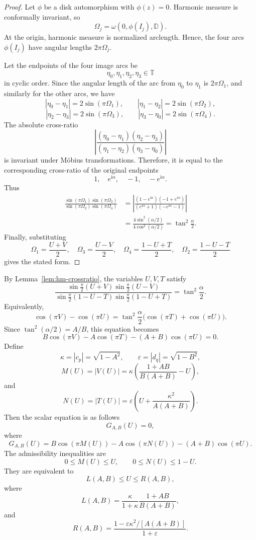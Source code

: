 \documentclass[11pt]{amsart}
\theoremstyle{remark}
\newcommand{\ii}{\mathrm i}
\newcommand{\eps}{\varepsilon}
\numberwithin{equation}{section}
\begin{document}
\begin{proof}
Let \(\phi\) be a disk automorphism with \(\phi(z)=0\).  Harmonic measure is
conformally invariant, so
\[
        \Omega_j=\omega(0,\phi(I_j),\mathbb D).
\]
At the origin, harmonic measure is normalized arclength.  Hence, the four arcs
\(\phi(I_j)\) have angular lengths \(2\pi\Omega_j\).

Let the endpoints of the four image arcs be
\[
        \eta_0,\eta_1,\eta_2,\eta_3\in\mathbb T
\]
in cyclic order.  Since the angular length of the arc from \(\eta_0\) to
\(\eta_1\) is \(2\pi\Omega_1\), and similarly for the other arcs, we have
\[
        |\eta_0-\eta_1|=2\sin(\pi\Omega_1),\qquad
        |\eta_1-\eta_2|=2\sin(\pi\Omega_2),
\]
\[
        |\eta_2-\eta_3|=2\sin(\pi\Omega_3),\qquad
        |\eta_3-\eta_0|=2\sin(\pi\Omega_4).
\]
The absolute cross-ratio
\[
        \left|
        \frac{(\eta_0-\eta_1)(\eta_2-\eta_3)}
        {(\eta_1-\eta_2)(\eta_3-\eta_0)}
        \right|
\]
is invariant under M\"obius transformations.  Therefore, it is equal to the
corresponding cross-ratio of the original endpoints
\[
        1,\quad e^{\ii\alpha},\quad -1,\quad -e^{\ii\alpha}.
\]
Thus
\[
\begin{aligned}
\frac{\sin(\pi\Omega_1)\sin(\pi\Omega_3)}
     {\sin(\pi\Omega_2)\sin(\pi\Omega_4)}
&=
\left|
\frac{(1-e^{\ii\alpha})(-1+e^{\ii\alpha})}
{(e^{\ii\alpha}+1)(-e^{\ii\alpha}-1)}
\right|    \\
&=
\frac{4\sin^2(\alpha/2)}{4\cos^2(\alpha/2)}
=
\tan^2\frac{\alpha}{2}.
\end{aligned}
\]
Finally, substituting
\[
        \Omega_1=\frac{U+V}{2},\quad
        \Omega_3=\frac{U-V}{2},\quad
        \Omega_4=\frac{1-U+T}{2},\quad
        \Omega_2=\frac{1-U-T}{2}
\]
gives the stated form.
\end{proof}
By Lemma~\ref{lem:hm-crossratio}, the variables \(U,V,T\) satisfy
\[
\frac{
\sin\frac{\pi}{2}(U+V)
\sin\frac{\pi}{2}(U-V)}{
\sin\frac{\pi}{2}(1-U-T)
\sin\frac{\pi}{2}(1-U+T)}
        =\tan^2\frac{\alpha}{2}.
\]
Equivalently,
\[
        \cos(\pi V)-\cos(\pi U)
        =\tan^2\frac{\alpha}{2}\bigl(\cos(\pi T)+\cos(\pi U)\bigr).
\]
Since $\tan^2(\alpha/2)=A/B$, this equation becomes
\[
        B\cos(\pi V)-A\cos(\pi T)-(A+B)\cos(\pi U)=0.
\]
Define
\[
        \kappa=|c_p|=\sqrt{1-A^2},
        \qquad
        \eps=|d_q|=\sqrt{1-B^2},
\]
\[
        M(U)=|V(U)|=\kappa\left(\frac{1+AB}{B(A+B)}-U\right),
\]
and
\[
        N(U)=|T(U)|=\eps\left(U+\frac{\kappa^2}{A(A+B)}\right).
\]
Then the scalar equation is as follows
\[
        G_{A,B}(U)=0,
\]
where
\[
        G_{A,B}(U)
        =B\cos(\pi M(U))-A\cos(\pi N(U))-(A+B)\cos(\pi U).
\]
The admissibility inequalities are
\[
        0\leq M(U)\leq U,
        \qquad
        0\leq N(U)\leq 1-U.
\]
They are equivalent to
\[
        L(A,B)\leq U\leq R(A,B),
\]
where
\[
        L(A,B)=\frac{\kappa}{1+
        \kappa}\frac{1+AB}{B(A+B)},
\]
and
\[
        R(A,B)=\frac{1-\eps\kappa^2/[A(A+B)]}{1+
        \eps}.
\]
\end{document}
